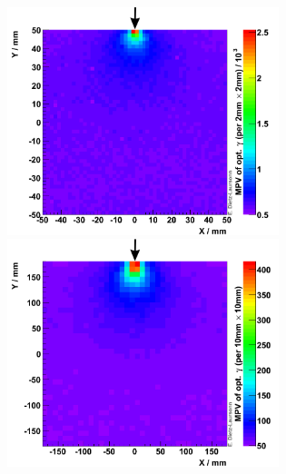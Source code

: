 \begin{figure}[h]
\centering
\includegraphics[width=7.9cm]{Figures/dietzlaursonn/101_100x5x100_Teflon__dataSim_opticalPhotons_on_SiPM_vs_hit_position.png}
\includegraphics[width=7.9cm]{Figures/dietzlaursonn/101_350x5x350_Teflon__dataSim_opticalPhotons_on_SiPM_vs_hit_position.png}


\end{figure}
